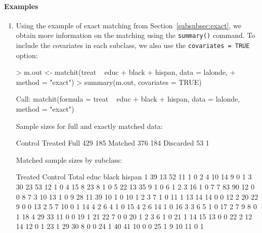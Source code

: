 \documentclass[oneside,letterpaper,titlepage]{article}
\begin{document}
\paragraph{Examples}
\begin{enumerate}
\item Using the example of exact matching from
  Section~\ref{subsubsec:exact}, we obtain more information on the
  matching using the {\tt summary()} command.  To include the
  covariates in each subclass, we also use the \texttt{covariates =
    TRUE} option:

\begin{Schunk}
\begin{Sinput}
> m.out <- matchit(treat ~ educ + black + hispan, data = lalonde, 
+     method = "exact")
> summary(m.out, covariates = TRUE)
\end{Sinput}
\begin{Soutput}

Call:
matchit(formula = treat ~ educ + black + hispan, data = lalonde,     method = "exact")


Sample sizes for full and exactly matched data:

          Control Treated
Full          429     185
Matched       376     184
Discarded      53       1

Matched sample sizes by subclass:

   Treated Control Total educ black hispan
1       39      13    52   11     1      0
2        4      10    14    9     0      1
3       30      23    53   12     1      0
4       15       8    23    8     1      0
5       22      13    35    9     1      0
6        1       2     3   16     1      0
7        7      83    90   12     0      0
8        7       3    10   13     1      0
9       28      11    39   10     1      0
10       1       2     3    7     1      0
11       1      13    14   14     0      0
12       2      20    22    9     0      0
13       2       5     7   10     0      1
14       4       2     6    4     1      0
15       4       2     6   14     1      0
16       3       3     6    5     1      0
17       2       7     9    8     0      1
18       4      29    33   11     0      0
19       1      21    22    7     0      0
20       1       2     3    6     1      0
21       1      14    15   13     0      0
22       2      12    14   12     0      1
23       1      29    30    8     0      0
24       1      40    41   10     0      0
25       1       9    10   11     0      1



\end{Soutput}
\end{Schunk}
\end{enumerate}
\end{document}
